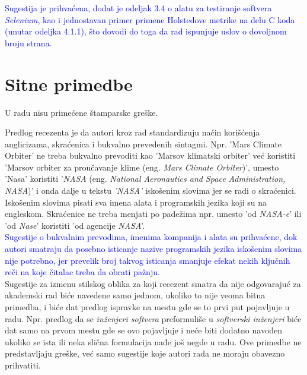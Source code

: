 \documentclass[a4paper]{report}
\newcommand{\odgovor}[1]{\textcolor{blue}{#1}}
\begin{document}
\odgovor{
Sugestija je prihvaćena, dodat je odeljak 3.4 o alatu za testiranje softvera \textit{Selenium}, kao i jednostavan primer primene Holstedove metrike na delu C koda (unutar odeljka 4.1.1), što dovodi do toga da rad ispunjuje uslov o dovoljnom broju strana.
}

\section{Sitne primedbe}
U radu nisu primećene štamparske greške. 

Predlog recezenta je da autori kroz rad standardizuju način korišćenja anglicizama, skraćenica i bukvalno prevedenih sintagmi. Npr. 'Mars Climate Orbiter' ne treba bukvalno prevoditi kao 'Marsov klimatski orbiter' već koristiti 'Marsov orbiter za proučavanje klime (eng. \textit{Mars Climate Orbiter})', umesto 'Nasa' koristiti '\textit{NASA} (eng. \textit{National Aeronautics and Space Administration, NASA})' i onda dalje u tekstu \textit{'NASA'} iskošenim slovima jer se radi o skraćenici. Iskošenim slovima pisati sva imena alata i programskih jezika koji su na engleskom. Skraćenice ne treba menjati po padežima npr. umesto 'od \textit{NASA-e}' ili 'od \textit{Nase}' koristiti 'od agencije \textit{NASA}'.\\

\odgovor{
Sugestije o bukvalnim prevodima, imenima kompanija i alata su prihvaćene, dok autori smatraju da posebno isticanje nazive programskih jezika iskošenim slovima nije potrebno, jer prevelik broj takvog isticanja smanjuje efekat nekih ključnih reči na koje čitalac treba da obrati pažnju.
}\\

Sugestije za izmenu stilskog oblika za koji recezent smatra da nije odgovarajuć za akademski rad biće navedene samo jednom, ukoliko to nije veoma bitna primedba, i biće dat predlog ispravke na mestu gde se to prvi put pojavljuje u radu. Npr. predlog da se \textit{inženjeri softvera} preformuliše u \textit{softverski inženjeri} biće dat samo na prvom mestu gde se ovo pojavljuje i neće biti dodatno navođen ukoliko se ista ili neka slična formulacija nađe još negde u radu. Ove primedbe ne predstavljaju greške, već samo sugestije koje autori rada ne moraju obavezno prihvatiti.
\end{document}
